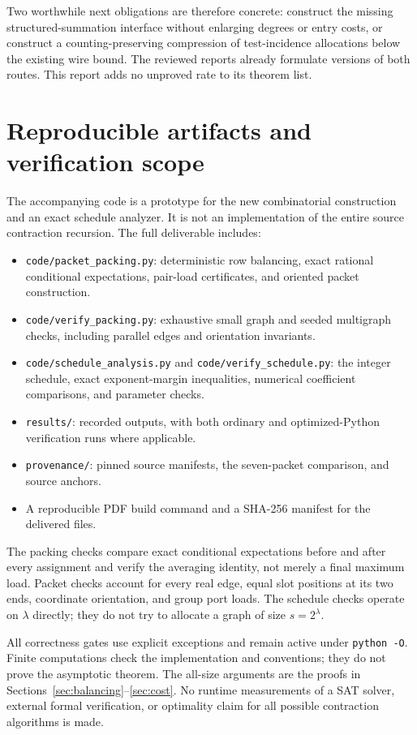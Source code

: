 \documentclass[11pt,letterpaper]{article}
\numberwithin{equation}{section}
\theoremstyle{definition}\newtheorem{definition}[theorem]{Definition}
\theoremstyle{remark}\newtheorem{remark}[theorem]{Remark}
\begin{document}
Two worthwhile next obligations are therefore concrete: construct the missing structured-summation interface without enlarging degrees or entry costs, or construct a counting-preserving compression of test-incidence allocations below the existing wire bound. The reviewed reports already formulate versions of both routes. This report adds no unproved rate to its theorem list.

\section{Reproducible artifacts and verification scope}
\label{sec:verification}

The accompanying code is a prototype for the new combinatorial construction and an exact schedule analyzer. It is not an implementation of the entire source contraction recursion. The full deliverable includes:
\begin{itemize}
\item \texttt{code/packet\_packing.py}: deterministic row balancing, exact rational conditional expectations, pair-load certificates, and oriented packet construction.
\item \texttt{code/verify\_packing.py}: exhaustive small graph and seeded multigraph checks, including parallel edges and orientation invariants.
\item \texttt{code/schedule\_analysis.py} and \texttt{code/verify\_schedule.py}: the integer schedule, exact exponent-margin inequalities, numerical coefficient comparisons, and parameter checks.
\item \texttt{results/}: recorded outputs, with both ordinary and optimized-Python verification runs where applicable.
\item \texttt{provenance/}: pinned source manifests, the seven-packet comparison, and source anchors.
\item A reproducible PDF build command and a SHA-256 manifest for the delivered files.
\end{itemize}

The packing checks compare exact conditional expectations before and after every assignment and verify the averaging identity, not merely a final maximum load. Packet checks account for every real edge, equal slot positions at its two ends, coordinate orientation, and group port loads. The schedule checks operate on $\lambda$ directly; they do not try to allocate a graph of size $s=2^\lambda$.

All correctness gates use explicit exceptions and remain active under \texttt{python -O}. Finite computations check the implementation and conventions; they do not prove the asymptotic theorem. The all-size arguments are the proofs in Sections~\ref{sec:balancing}--\ref{sec:cost}. No runtime measurements of a SAT solver, external formal verification, or optimality claim for all possible contraction algorithms is made.
\end{document}
